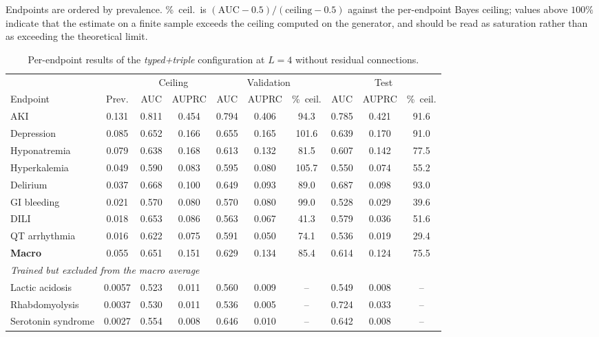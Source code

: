 Endpoints are ordered by prevalence. \%~ceil.\ is
    $(\mathrm{AUC}-0.5)/(\mathrm{ceiling}-0.5)$ against the per-endpoint
    Bayes ceiling; values above $100\%$ indicate that the estimate on a
    finite sample exceeds the ceiling computed on the generator, and should
    be read as saturation rather than as exceeding the theoretical limit.

    \begin{table}[htbp]
      \centering
      \small
      \setlength{\tabcolsep}{4pt}
      \caption{Per-endpoint results of the \emph{typed+triple} configuration at
        $L=4$ without residual connections.}
      \label{tab:per-endpoint}
      \begin{tabular}{lccc ccc ccc}
        \toprule
        & & \multicolumn{2}{c}{Ceiling} & \multicolumn{3}{c}{Validation} & \multicolumn{3}{c}{Test} \\
        \cmidrule(lr){3-4}\cmidrule(lr){5-7}\cmidrule(lr){8-10}
        Endpoint & Prev. & AUC & AUPRC & AUC & AUPRC & \%~ceil. & AUC & AUPRC & \%~ceil. \\
        \midrule
        AKI                & 0.131 & 0.811 & 0.454 & 0.794 & 0.406 & 94.3  & 0.785 & 0.421 & 91.6 \\
        Depression         & 0.085 & 0.652 & 0.166 & 0.655 & 0.165 & 101.6 & 0.639 & 0.170 & 91.0 \\
        Hyponatremia       & 0.079 & 0.638 & 0.168 & 0.613 & 0.132 & 81.5  & 0.607 & 0.142 & 77.5 \\
        Hyperkalemia       & 0.049 & 0.590 & 0.083 & 0.595 & 0.080 & 105.7 & 0.550 & 0.074 & 55.2 \\
        Delirium           & 0.037 & 0.668 & 0.100 & 0.649 & 0.093 & 89.0  & 0.687 & 0.098 & 93.0 \\
        GI bleeding        & 0.021 & 0.570 & 0.080 & 0.570 & 0.080 & 99.0  & 0.528 & 0.029 & 39.6 \\
        DILI               & 0.018 & 0.653 & 0.086 & 0.563 & 0.067 & 41.3  & 0.579 & 0.036 & 51.6 \\
        QT arrhythmia      & 0.016 & 0.622 & 0.075 & 0.591 & 0.050 & 74.1  & 0.536 & 0.019 & 29.4 \\
        \midrule
        \textbf{Macro}     & 0.055 & 0.651 & 0.151 & 0.629 & 0.134 & 85.4  & 0.614 & 0.124 & 75.5 \\
        \midrule
        \multicolumn{10}{l}{\emph{Trained but excluded from the macro average}} \\
        Lactic acidosis    & 0.0057 & 0.523 & 0.011 & 0.560 & 0.009 & {--} & 0.549 & 0.008 & {--} \\
        Rhabdomyolysis     & 0.0037 & 0.530 & 0.011 & 0.536 & 0.005 & {--} & 0.724 & 0.033 & {--} \\
        Serotonin syndrome & 0.0027 & 0.554 & 0.008 & 0.646 & 0.010 & {--} & 0.642 & 0.008 & {--} \\
        \bottomrule
      \end{tabular}
    \end{table}